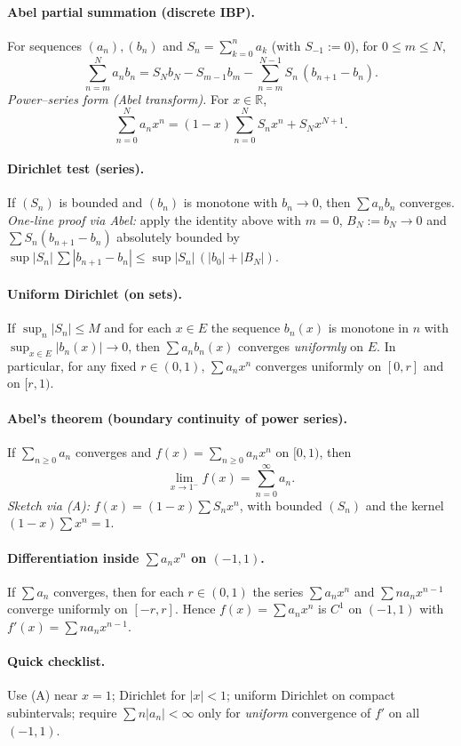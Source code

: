 \documentclass[12pt,a4paper]{article}
\theoremstyle{plain}
\theoremstyle{definition}
\theoremstyle{remark}
\theoremstyle{remark}
\begin{document}
\begin{tcolorbox}[title=Abel–Dirichlet Cheat-Sheet,colback=white,colframe=black,
	fonttitle=\bfseries,boxsep=4pt,arc=2pt]
	
	\paragraph{Abel partial summation (discrete IBP).}
	For sequences $(a_n),(b_n)$ and $S_n=\sum_{k=0}^n a_k$ (with $S_{-1}:=0$), for $0\le m\le N$,
	\[
	\sum_{n=m}^N a_n b_n
	= S_N b_N - S_{m-1} b_m - \sum_{n=m}^{N-1} S_n\,(b_{n+1}-b_n).
	\]
	\textit{Power–series form (Abel transform).} For $x\in\mathbb R$,
	\[
	\sum_{n=0}^N a_n x^n=(1-x)\sum_{n=0}^N S_n x^n + S_N x^{N+1}. \tag{A}
	\]
	
	\paragraph{Dirichlet test (series).}
	If $(S_n)$ is bounded and $(b_n)$ is monotone with $b_n\!\to\!0$, then $\sum a_n b_n$ converges.\\
	\textit{One-line proof via Abel:} apply the identity above with $m=0$, $B_N:=b_N\!\to\!0$ and
	$\sum S_n(b_{n+1}-b_n)$ absolutely bounded by $\sup|S_n|\,\sum|b_{n+1}-b_n| \le \sup|S_n|\,(|b_0|+|B_N|)$.
	
	\paragraph{Uniform Dirichlet (on sets).}
	If $\sup_n|S_n|\le M$ and for each $x\in E$ the sequence $b_n(x)$ is monotone in $n$ with
	$\sup_{x\in E}|b_n(x)|\to0$, then $\sum a_n b_n(x)$ converges \emph{uniformly} on $E$.
	In particular, for any fixed $r\in(0,1)$, $\sum a_n x^n$ converges uniformly on $[0,r]$ and on $[r,1)$.
	
	\paragraph{Abel’s theorem (boundary continuity of power series).}
	If $\sum_{n\ge0} a_n$ converges and $f(x)=\sum_{n\ge0} a_n x^n$ on $[0,1)$, then
	\[
	\lim_{x\to1^-} f(x)=\sum_{n=0}^\infty a_n.
	\]
	\textit{Sketch via (A):} $f(x)=(1-x)\sum S_n x^n$, with bounded $(S_n)$ and the kernel $(1-x)\sum x^n=1$.
	
	\paragraph{Differentiation inside $\textstyle\sum a_n x^n$ on $(-1,1)$.}
	If $\sum a_n$ converges, then for each $r\in(0,1)$ the series
	$\sum a_n x^n$ and $\sum n a_n x^{n-1}$ converge uniformly on $[-r,r]$.
	Hence $f(x)=\sum a_n x^n$ is $C^1$ on $(-1,1)$ with $f'(x)=\sum n a_n x^{n-1}$.
	
	\paragraph{Quick checklist.}
	Use (A) near $x=1$; Dirichlet for $|x|<1$; uniform Dirichlet on compact subintervals; require $\sum n|a_n|<\infty$
	only for \emph{uniform} convergence of $f'$ on all $(-1,1)$.
\end{tcolorbox}
	
\end{document}
